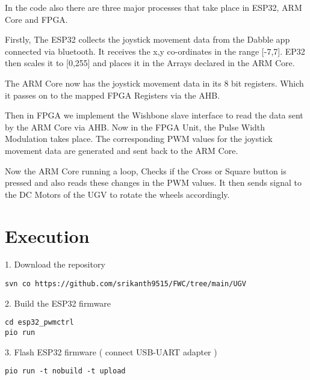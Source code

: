 \documentclass[journal,15pt,twocolumn,tikz, border=5mm]{IEEEtran}
\begin{document}
In the code also there are three major processes that take place in ESP32, ARM Core and FPGA.\\
\vspace{0.25cm}

Firstly, The ESP32 collects the joystick movement data from the Dabble app connected via bluetooth. It receives the x,y co-ordinates in the range [-7,7]. EP32 then scales it to [0,255] and places it in the Arrays declared in the ARM Core. \\

\vspace{0.25cm}

The ARM Core now has the joystick movement data in its 8 bit registers. Which it passes on to the mapped FPGA Registers via the AHB.\\

\vspace{0.25cm}

Then in FPGA we implement the Wishbone slave interface to read the data sent by the ARM Core via AHB. Now in the FPGA Unit, the Pulse Width Modulation takes place. The corresponding PWM values for the joystick movement data are generated and sent back to the ARM Core.\\

\vspace{0.25cm}

Now the ARM Core running a loop, Checks if the Cross or Square button is pressed and also reads these changes in the PWM values. It then sends signal to the DC Motors of the UGV to rotate the wheels accordingly.\\

\section{Execution}
\raggedright
1. Download the repository

\begin{lstlisting}
svn co https://github.com/srikanth9515/FWC/tree/main/UGV
\end{lstlisting}

2. Build the ESP32 firmware
\begin{lstlisting}
cd esp32_pwmctrl
pio run
\end{lstlisting} 

3. Flash ESP32 firmware ( connect USB-UART adapter )
\begin{lstlisting}
pio run -t nobuild -t upload
\end{lstlisting} 
\end{document}
